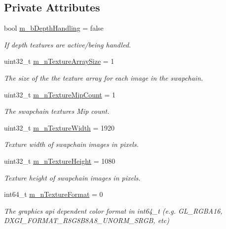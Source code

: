 \subsection*{Private Attributes}
\begin{DoxyCompactItemize}
\item 
bool \mbox{\hyperlink{class_open_x_r_provider_1_1_x_r_render_manager_a4d4e6d227ba36b18b9c25321ab5c21c1}{m\+\_\+b\+Depth\+Handling}} = false
\begin{DoxyCompactList}\small\item\em If depth textures are active/being handled. \end{DoxyCompactList}\item 
uint32\+\_\+t \mbox{\hyperlink{class_open_x_r_provider_1_1_x_r_render_manager_adcd4b8ab0842133a0e2875b0aab2f68b}{m\+\_\+n\+Texture\+Array\+Size}} = 1
\begin{DoxyCompactList}\small\item\em The size of the the texture array for each image in the swapchain. \end{DoxyCompactList}\item 
uint32\+\_\+t \mbox{\hyperlink{class_open_x_r_provider_1_1_x_r_render_manager_a51f67678cd3a65f4dfc92f62b32aac17}{m\+\_\+n\+Texture\+Mip\+Count}} = 1
\begin{DoxyCompactList}\small\item\em The swapchain textures\textquotesingle{} Mip count. \end{DoxyCompactList}\item 
uint32\+\_\+t \mbox{\hyperlink{class_open_x_r_provider_1_1_x_r_render_manager_a2194cf35100c01e5fe28d9fedac9e2c4}{m\+\_\+n\+Texture\+Width}} = 1920
\begin{DoxyCompactList}\small\item\em Texture width of swapchain images in pixels. \end{DoxyCompactList}\item 
uint32\+\_\+t \mbox{\hyperlink{class_open_x_r_provider_1_1_x_r_render_manager_ae6111a1d0d9d3b6a8d9f0699f08d5f16}{m\+\_\+n\+Texture\+Height}} = 1080
\begin{DoxyCompactList}\small\item\em Texture height of swapchain images in pixels. \end{DoxyCompactList}\item 
int64\+\_\+t \mbox{\hyperlink{class_open_x_r_provider_1_1_x_r_render_manager_a1b4dbf6afd6f407134f5df826ce7d854}{m\+\_\+n\+Texture\+Format}} = 0
\begin{DoxyCompactList}\small\item\em The graphics api dependent color format in int64\+\_\+t (e.\+g. G\+L\+\_\+\+R\+G\+B\+A16, D\+X\+G\+I\+\_\+\+F\+O\+R\+M\+A\+T\+\_\+\+R8\+G8\+B8\+A8\+\_\+\+U\+N\+O\+R\+M\+\_\+\+S\+R\+GB, etc) \end{DoxyCompactList}\item 

\end{DoxyCompactItemize}

